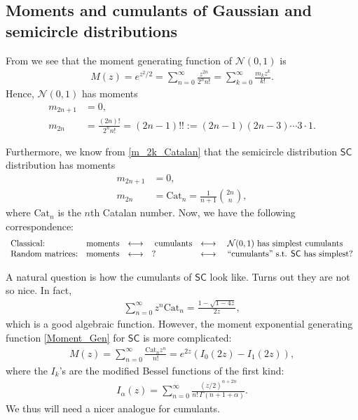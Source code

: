 \documentclass[letterpaper,11pt,oneside,reqno]{amsart}
\numberwithin{equation}{section}
\newcommand{\SC}{\mathsf{SC}}
\theoremstyle{definition}
\begin{document}

\subsection{Moments and cumulants of Gaussian and semicircle distributions} %
\label{sub:moments_and_cumulants_of_gaussian_and_semicircle_distributions}

From  we see that 
the moment generating function of $\mathcal{N}(0,1)$ is 
\begin{align*}
    M(z)=e^{z^2/2}=\sum_{n=0}^\infty \frac{z^{2n}}{2^nn!}=\sum_{k=0}^\infty \frac{m_k z^k}{k!}.
\end{align*}
Hence, $\mathcal{N}(0,1)$ has moments
\begin{align*}
    m_{2n+1} &=0,\\
    m_{2n}& = \frac{(2n)!}{2^nn!}=(2n-1)!!:=(2n-1)(2n-3)\cdots 3\cdot 1.
\end{align*}

Furthermore, we know from \eqref{m_2k_Catalan} that the semicircle distribution $\SC$ distribution has moments 
\begin{align*}
    m_{2n+1} &=0,\\
    m_{2n}& = \mathrm{Cat}_n=\frac{1}{n+1} {{2n}\choose{n}},
\end{align*}
where $\mathrm{Cat}_n$ is the $n$th Catalan number.
Now, we have the following correspondence:
\begin{equation*}
\begin{array}{llclcl}
\text{Classical:} &  \text{moments} & \longleftrightarrow &\  \text{cumulants} &\longleftrightarrow & \ \mathcal{N}(0,1) \ \text{has simplest cumulants}\\
\text{Random matrices:} & \text{moments} & \longleftrightarrow & ? &\longleftrightarrow &  \ \textnormal{``cumulants'' s.t. $\SC$ has simplest?}\\
\end{array}	
\end{equation*}

A natural question is how the cumulants of $\SC$ look like. Turns out they are not so nice. In fact, 
\begin{align*}
    \sum_{n=0}^\infty z^n \mathrm{Cat}_n=\frac{1-\sqrt{1-4z}}{2z},
\end{align*}
which is a good algebraic function. However, the moment exponential generating function
\eqref{Moment_Gen} 
for $\SC$ is more complicated:
\begin{align*}
    M(z)=\sum_{n=0}^\infty \frac{\mathrm{Cat}_nz^n}{n!}=e^{2z}(I_0(2z)-I_1(2z)),
\end{align*}
where the $I_k$'s are the modified Bessel functions of the first kind:
\begin{align*}
    I_\alpha(z)=\sum_{n=0}^\infty \frac{(z/2)^{\alpha+2n}}{n!\,\Gamma(n+1+\alpha)}.
\end{align*}
We thus will need a nicer analogue for cumulants.
\end{document}
